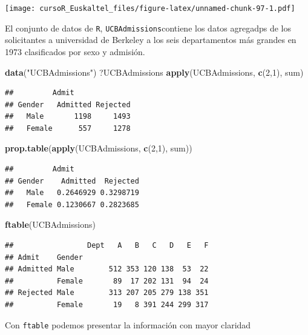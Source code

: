 \documentclass[]{book}
\newenvironment{Shaded}{\begin{snugshade}}{\end{snugshade}}
\newcommand{\KeywordTok}[1]{\textcolor[rgb]{0.13,0.29,0.53}{\textbf{#1}}}
\newcommand{\DecValTok}[1]{\textcolor[rgb]{0.00,0.00,0.81}{#1}}
\newcommand{\StringTok}[1]{\textcolor[rgb]{0.31,0.60,0.02}{#1}}
\newcommand{\NormalTok}[1]{#1}
\begin{document}
\texttt{[image: cursoR\_Euskaltel\_files/figure-latex/unnamed-chunk-97-1.pdf]}

El conjunto de datos de \texttt{R}, \texttt{UCBAdmissions}contiene los
datos agregadps de los solicitantes a universidad de Berkeley a los seis
departamentos más grandes en 1973 clasificados por sexo y admisión.

\begin{Shaded}
\begin{Highlighting}[]
\KeywordTok{data}\NormalTok{(}\StringTok{"UCBAdmissions"}\NormalTok{)}
\NormalTok{?UCBAdmissions}
\KeywordTok{apply}\NormalTok{(UCBAdmissions, }\KeywordTok{c}\NormalTok{(}\DecValTok{2}\NormalTok{,}\DecValTok{1}\NormalTok{), sum)}
\end{Highlighting}
\end{Shaded}

\begin{verbatim}
##         Admit
## Gender   Admitted Rejected
##   Male       1198     1493
##   Female      557     1278
\end{verbatim}

\begin{Shaded}
\begin{Highlighting}[]
\KeywordTok{prop.table}\NormalTok{(}\KeywordTok{apply}\NormalTok{(UCBAdmissions, }\KeywordTok{c}\NormalTok{(}\DecValTok{2}\NormalTok{,}\DecValTok{1}\NormalTok{), sum))}
\end{Highlighting}
\end{Shaded}

\begin{verbatim}
##         Admit
## Gender    Admitted  Rejected
##   Male   0.2646929 0.3298719
##   Female 0.1230667 0.2823685
\end{verbatim}

\begin{Shaded}
\begin{Highlighting}[]
\KeywordTok{ftable}\NormalTok{(UCBAdmissions)}
\end{Highlighting}
\end{Shaded}

\begin{verbatim}
##                 Dept   A   B   C   D   E   F
## Admit    Gender                             
## Admitted Male        512 353 120 138  53  22
##          Female       89  17 202 131  94  24
## Rejected Male        313 207 205 279 138 351
##          Female       19   8 391 244 299 317
\end{verbatim}

Con \texttt{ftable} podemos presentar la información con mayor claridad
\end{document}
